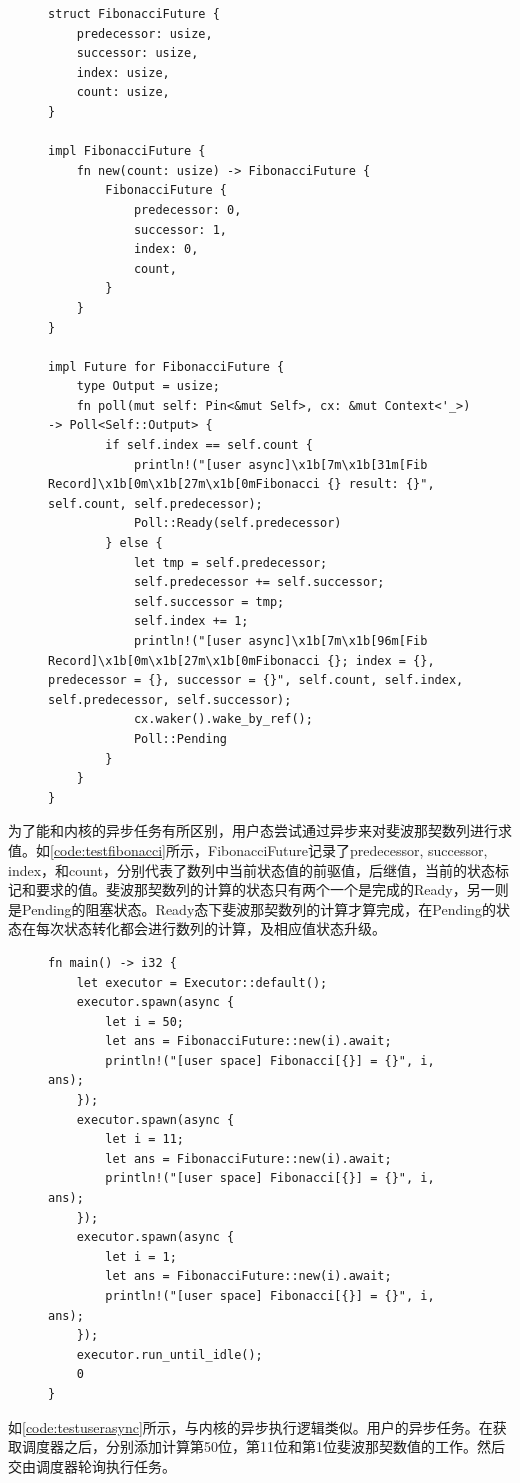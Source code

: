 \begin{figure}[h]
\begin{lstlisting}[caption=异步计算斐波那契数列, label=code:testfibonacci]
struct FibonacciFuture {
    predecessor: usize,
    successor: usize,
    index: usize,
    count: usize,
}

impl FibonacciFuture {
    fn new(count: usize) -> FibonacciFuture {
        FibonacciFuture {
            predecessor: 0,
            successor: 1,
            index: 0,
            count,
        }
    }
}

impl Future for FibonacciFuture {
    type Output = usize;
    fn poll(mut self: Pin<&mut Self>, cx: &mut Context<'_>) -> Poll<Self::Output> {
        if self.index == self.count {
            println!("[user async]\x1b[7m\x1b[31m[Fib Record]\x1b[0m\x1b[27m\x1b[0mFibonacci {} result: {}", self.count, self.predecessor);
            Poll::Ready(self.predecessor)
        } else {
            let tmp = self.predecessor;
            self.predecessor += self.successor;
            self.successor = tmp;
            self.index += 1;
            println!("[user async]\x1b[7m\x1b[96m[Fib Record]\x1b[0m\x1b[27m\x1b[0mFibonacci {}; index = {}, predecessor = {}, successor = {}", self.count, self.index, self.predecessor, self.successor);
            cx.waker().wake_by_ref();
            Poll::Pending
        }
    }
}
\end{lstlisting}
\end{figure}
为了能和内核的异步任务有所区别，用户态尝试通过异步来对斐波那契数列进行求值。如\autoref{code:testfibonacci}所示，FibonacciFuture记录了predecessor, successor, index，和count，分别代表了数列中当前状态值的前驱值，后继值，当前的状态标记和要求的值。斐波那契数列的计算的状态只有两个一个是完成的Ready，另一则是Pending的阻塞状态。Ready态下斐波那契数列的计算才算完成，在Pending的状态在每次状态转化都会进行数列的计算，及相应值状态升级。


\begin{figure}[h]
\begin{lstlisting}[caption=用户异步任务测试代码, label=code:testuserasync]
fn main() -> i32 {
    let executor = Executor::default();
    executor.spawn(async {
        let i = 50;
        let ans = FibonacciFuture::new(i).await;
        println!("[user space] Fibonacci[{}] = {}", i, ans);
    });
    executor.spawn(async {
        let i = 11;
        let ans = FibonacciFuture::new(i).await;
        println!("[user space] Fibonacci[{}] = {}", i, ans);
    });
    executor.spawn(async {
        let i = 1;
        let ans = FibonacciFuture::new(i).await;
        println!("[user space] Fibonacci[{}] = {}", i, ans);
    });
    executor.run_until_idle();
    0
}
\end{lstlisting}
\end{figure}
如\autoref{code:testuserasync}所示，与内核的异步执行逻辑类似。用户的异步任务。在获取调度器之后，分别添加计算第50位，第11位和第1位斐波那契数值的工作。然后交由调度器轮询执行任务。

